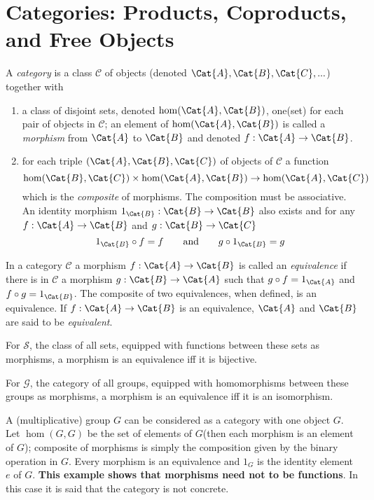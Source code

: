\section{Categories: Products, Coproducts, and Free Objects}
\begin{Definition}
	A \textit{category} is a class $ \mathscr{C} $ of objects (denoted $ \Cat{A},\Cat{B}, \Cat{C}, ... $) together with
	\begin{enumerate}
		\item a class of disjoint sets, denoted $ \hom(\Cat{A},\Cat{B}) $, one(set) for each pair of objects in $ \mathscr{C} $; an element of $ \hom (\Cat{A},\Cat{B}) $ is called a \textit{morphism} from $ \Cat{A} $ to $ \Cat{B} $ and denoted $ f:\Cat{A}\to \Cat{B} $. 
		\item for each triple $ (\Cat{A},\Cat{B},\Cat{C}) $ of objects of $ \mathscr{C} $ a function
		\begin{equation}
			\hom(\Cat{B},\Cat{C}) \times \hom(\Cat{A},\Cat{B})  \to \hom(\Cat{A},\Cat{C}) \nonumber
		\end{equation}
		which is the \textit{composite} of morphisms. The composition must be associative. An identity morphism $ 1_{\Cat{B}}:\Cat{B} \to \Cat{B} $ also exists and for any $ f:\Cat{A}\to \Cat{B} $ and $ g:\Cat{B}\to \Cat{C} $
		\begin{equation}
			1_{\Cat{B}} \circ f = f\qquad \text{and}\qquad g \circ 1_{\Cat{B}} = g \nonumber
		\end{equation}
	\end{enumerate}
\end{Definition}
\begin{Definition}
	In a category $ \mathscr{C} $ a morphism $ f:\Cat{A} \to \Cat{B} $ is called an \textit{equivalence} if there is in $ \mathscr{C} $ a morphism $ g:\Cat{B} \to \Cat{A}  $ such that $ g \circ f=1_{\Cat{A}} $ and $ f \circ g=1_{\Cat{B}} $. The composite of two equivalences, when defined, is an equivalence. If $ f:\Cat{A} \to \Cat{B}$ is an equivalence, $ \Cat{A} $ and $ \Cat{B} $ are said to be \textit{equivalent}.
\end{Definition}
\begin{Example}
	For $ \mathscr{S} $, the class of all sets, equipped with functions between these sets as morphisms, a morphism is an equivalence iff it is bijective. 
\end{Example}
\begin{Example}
	For $ \mathscr{G} $, the category of all groups, equipped with homomorphisms between these groups as morphisms, a morphism is an equivalence iff it is an isomorphism.
\end{Example}
\begin{Example}
	A (multiplicative) group $ G $ can be considered as a category with one object $ G $. Let $ \hom(G,G) $ be the set of elements of $ G $(then each morphism is an element of $ G $); composite of morphisms is simply the composition given by the binary operation in $ G $. Every morphism is an equivalence and $ 1_G $ is the identity element $ e $ of $ G $. \textbf{This example shows that morphisms need not to be functions}. In this case it is said that the category is not concrete.
\end{Example}

